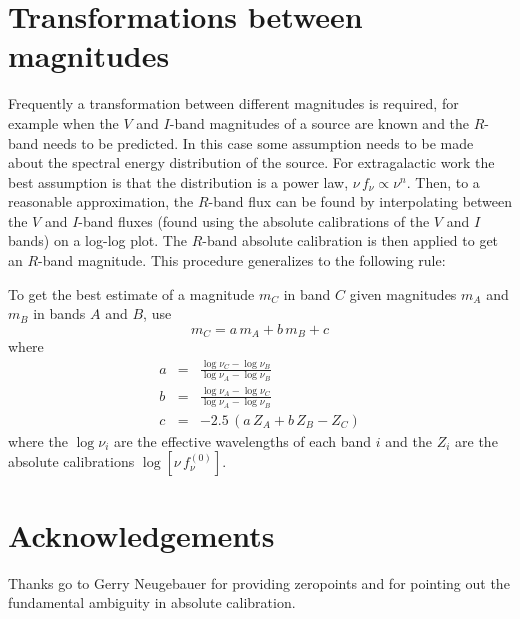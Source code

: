\section{Transformations between magnitudes}

Frequently a transformation between different magnitudes is required,
for example when the $V$ and $I$-band magnitudes of a source are known
and the $R$-band needs to be predicted.  In this case some assumption
needs to be made about the spectral energy distribution of the source.
For extragalactic work the best assumption is that the distribution is
a power law, $\nu\,f_{\nu}\propto\nu^n$.  Then, to a reasonable
approximation, the $R$-band flux can be found by interpolating between
the $V$ and $I$-band fluxes (found using the absolute calibrations of
the $V$ and $I$ bands) on a log-log plot.  The $R$-band absolute
calibration is then applied to get an $R$-band magnitude.  This
procedure generalizes to the following rule:

To get the best estimate of a magnitude $m_C$ in band $C$ given
magnitudes $m_A$ and $m_B$ in bands $A$ and $B$, use
\begin{equation}
m_C=a\,m_A+b\,m_B+c
\end{equation}
where
\begin{eqnarray}
a & = & \frac{\log\nu_C-\log\nu_B}{\log\nu_A-\log\nu_B} \\
b & = & \frac{\log\nu_A-\log\nu_C}{\log\nu_A-\log\nu_B} \\
c & = & -2.5\,(a\,Z_A+b\,Z_B-Z_C)
\end{eqnarray}
where the $\log\nu_i$ are the effective wavelengths of each band $i$
and the $Z_i$ are the absolute calibrations $\log[\nu\,f_{\nu}^{(0)}]$.


\section*{Acknowledgements}

Thanks go to Gerry Neugebauer for providing zeropoints and for
pointing out the fundamental ambiguity in absolute calibration.


